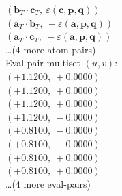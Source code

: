 \documentclass[a4paper,11pt]{article}
\newcommand{\fpbeomcfokjooi}[2]{\mathbf{#1}_T \cdot \mathbf{#2}_T}
\newcommand{\kblbmcpggoncpf}[3]{\varepsilon(\mathbf{#1},\mathbf{#2},\mathbf{#3})}
\begin{document}
$(\fpbeomcfokjooi{b}{c},\ \kblbmcpggoncpf{c}{p}{q})$\\
$(\fpbeomcfokjooi{a}{b},\ -\kblbmcpggoncpf{a}{p}{q})$\\
$(\fpbeomcfokjooi{a}{c},\ -\kblbmcpggoncpf{a}{p}{q})$\\
\quad \ldots (4 more atom-pairs)\\
\quad Eval-pair multiset $(u, v)$:\\
$(+1.1200,\ +0.0000)$\\
$(+1.1200,\ +0.0000)$\\
$(+1.1200,\ +0.0000)$\\
$(+1.1200,\ -0.0000)$\\
$(+0.8100,\ -0.0000)$\\
$(+0.8100,\ -0.0000)$\\
$(+0.8100,\ +0.0000)$\\
$(+0.8100,\ +0.0000)$\\
\quad \ldots (4 more eval-pairs)\\
\end{document}
